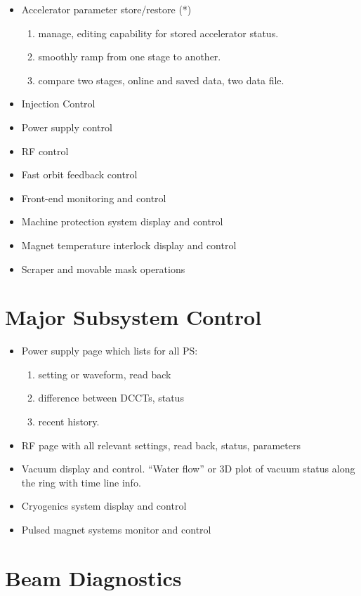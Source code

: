 \documentclass[11pt,oneside,letterpaper,showtrims,article]{memoir}
\begin{document}
\begin{itemize}
\item Accelerator parameter store/restore (*)
      \begin{enumerate}
      \item manage, editing capability for stored accelerator status.
      \item smoothly ramp from one stage to another.
      \item compare two stages, online and saved data, two data file.
      \end{enumerate}
\item Injection Control
\item Power supply control
\item RF control
\item Fast orbit feedback control
\item Front-end monitoring and control
\item Machine protection system display and control
\item Magnet temperature interlock display and control
\item Scraper and movable mask operations
\end{itemize}


\section{Major Subsystem Control}

\begin{itemize}
\item Power supply page which lists for all PS:
      \begin{enumerate}
      \item setting or waveform, read back
      \item difference between DCCTs, status
      \item recent history.
      \end{enumerate}
\item RF page with all relevant settings, read back, status, parameters
\item Vacuum display and control. ``Water flow'' or 3D plot of vacuum status along the ring with time line info.
\item Cryogenics system display and control
\item Pulsed magnet systems monitor and control
\end{itemize}


\section{Beam Diagnostics}
\end{document}
